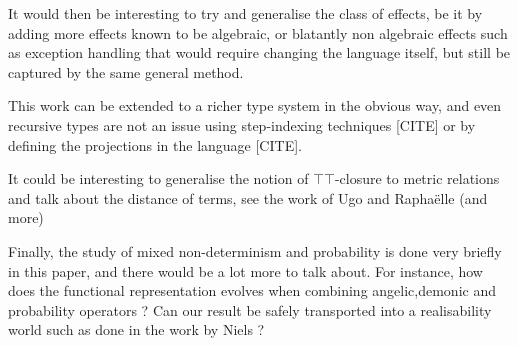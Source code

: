 It would then be interesting to try and generalise the class of 
effects, be it by adding more effects known to be algebraic, 
or blatantly non algebraic effects such as exception handling 
that would require changing the language itself, but still 
be captured by the same general method.

This work can be extended to a richer type system in the obvious 
way, and even recursive types are not an issue using step-indexing 
techniques [CITE] or by defining the projections in the language [CITE].

It could be interesting to generalise the notion of $\top\top$-closure 
to metric relations 
and talk about the distance of terms, see the work of Ugo and Raphaëlle
(and more)

Finally, the study of mixed non-determinism and probability is 
done very briefly in this paper, and there would be a lot more 
to talk about. For instance, how does the functional representation 
evolves when combining angelic,demonic and probability operators ?
Can our result be safely transported into a realisability world 
such as done in the work by Niels ?
